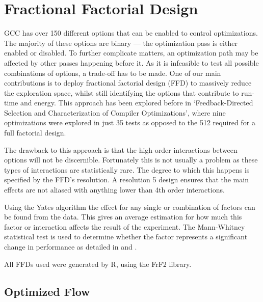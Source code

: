 \documentclass[twocolumn]{article}
\begin{document}
\section{Fractional Factorial Design}

GCC has over 150 different options that can be enabled to control optimizations. The majority of these options are binary --- the optimization pass is either enabled or disabled. To further complicate matters, an optimization path may be affected by other passes happening before it. As it is infeasible to test all possible combinations of options, a trade-off has to be made. One of our main contributions is to deploy fractional factorial design (FFD) to massively reduce the exploration space, whilst still identifying the options that contribute to run-time and energy. This approach has been explored before in `Feedback-Directed Selection and Characterization of Compiler Optimizations'\cite{IntelPaper}, where nine optimizations were explored in just 35 tests as opposed to the 512 required for a full factorial design.

The drawback to this approach is that the high-order interactions between options will not be discernible. Fortunately this is not usually a problem as these types of interactions are statistically rare. The degree to which this happens is specified by the FFD's resolution. A resolution 5 design ensures that the main effects are not aliased with anything lower than 4th order interactions.

Using the Yates algorithm\cite{BoxHunter} the effect for any single or combination of factors can be found from the data. This gives an average estimation for how much this factor or interaction affects the result of the experiment. The Mann-Whitney statistical test is used to determine whether the factor represents a significant change in performance as detailed in \cite{EnergyReductionCompilerOptions} and \cite{Haneda2005}.




All FFDs used were generated by R\cite{R}, using the FrF2 library\cite{FrF2}.

\subsection*{Optimized Flow}
\end{document}
